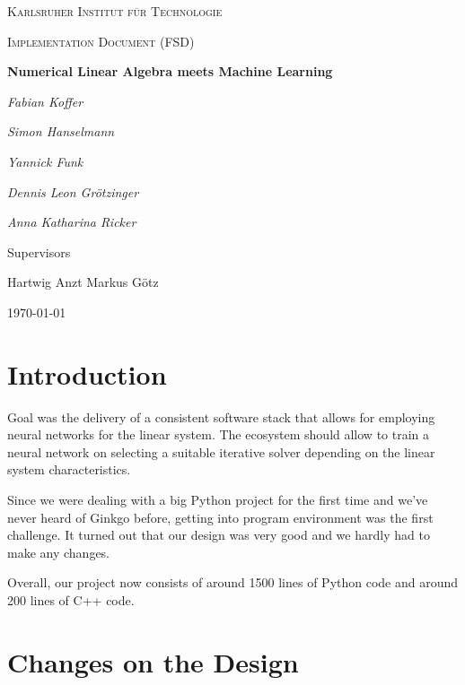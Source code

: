 \documentclass[parskip=full]{scrartcl}
\begin{document}
\begin{titlepage}
\centering
{\scshape\LARGE Karlsruher Institut für Technologie\par}
\vspace{1cm}
{\scshape\Large Implementation Document (FSD)\par}
\vspace{1.5cm}
{\huge\bfseries Numerical Linear Algebra meets Machine Learning \par}
\vspace {2cm}

{\Large\itshape Fabian Koffer\par}
{\Large\itshape Simon Hanselmann\par}
{\Large\itshape Yannick Funk\par}
{\Large\itshape Dennis Leon Gr\"{o}tzinger\par}
{\Large\itshape Anna Katharina Ricker\par}

\vfill
Supervisors\par
Hartwig Anzt
Markus G\"{o}tz

\vfill
{\large\today\par}
\end{titlepage}

\tableofcontents
\newpage


\section{Introduction}
Goal was the delivery of a consistent software stack that allows for employing \glspl{neural network} for the linear system. 
The ecosystem should allow to train a \gls{neural network} on selecting a suitable \gls{iterative solver} depending on the linear system characteristics.

Since we were dealing with a big \gls{Python} project for the first time and we've never heard of \gls{Ginkgo} before, getting into program environment was the first challenge.
It turned out that our design was very good and we hardly had to make any changes.

Overall, our project now consists of around 1500 lines of \gls{Python} code and around 200 lines of \gls{C++} code.


\section{Changes on the Design}
\end{document}

